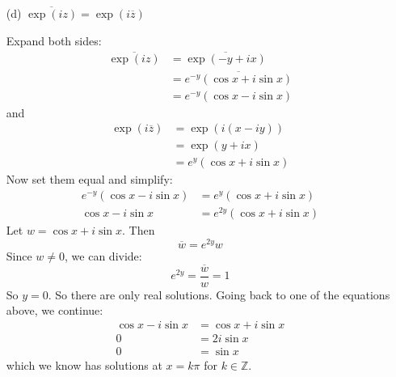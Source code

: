 \documentclass{article}
\begin{document}
\begin{itemize}
        \item [(d)] $\overline{\exp(i z)} = \exp(i\overline{z})$ 
            \begin{answer}
                Expand both sides:
                    \begin{align*}
                        \overline{\exp(iz)} &= \overline{\exp(-y + ix)}              \\
                                            &= \overline{e^{-y}(\cos{x} + i\sin{x})} \\
                                            &= e^{-y}(\cos{x} - i\sin{x})              
                    \end{align*}
                and
                    \begin{align*}
                        \exp(i\overline{z}) &= \exp(i(x - iy))           \\
                                            &= \exp(y + ix)              \\
                                            &= e^{y}(\cos{x} + i\sin{x})   
                    \end{align*}
                Now set them equal and simplify:
                    \begin{align*}
                        e^{-y}(\cos{x} - i\sin{x}) &= e^{y}(\cos{x} + i\sin{x})  \\
                        \cos{x} - i\sin{x}         &= e^{2y}(\cos{x} + i\sin{x})   
                    \end{align*}
                Let $w = \cos{x} + i\sin{x}$. Then 
                    \begin{equation*}
                        \overline{w} = e^{2y}w
                    \end{equation*}
                Since $w \neq 0$, we can divide:
                    \begin{equation*}
                        e^{2y} = \dfrac{\overline{w}}{w} = 1
                    \end{equation*}
                So $y = 0$. So there are only real solutions. Going back to one of the equations above, we continue:
                    \begin{align*}
                        \cos{x} - i\sin{x} &= \cos{x} + i\sin{x} \\
                        0                  &= 2i\sin{x}          \\
                        0                  &= \sin{x}              
                    \end{align*}
                which we know has solutions at $x = k\pi$ for $k \in \mathbb{Z}$.
            \end{answer}
    \end{itemize}
\end{document}
